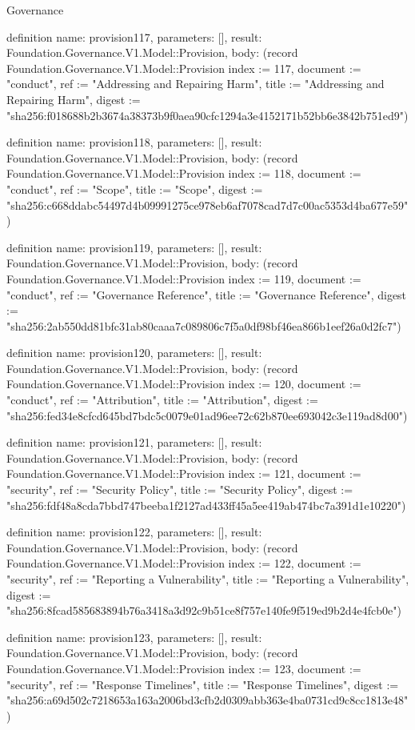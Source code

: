 \begin{lexlean}{Governance}
\begin{semanticmodule}
definition{
  name: provision117,
  parameters: [],
  result: Foundation.Governance.V1.Model::Provision,
  body: (record Foundation.Governance.V1.Model::Provision {index := 117, document := "conduct", ref := "Addressing and Repairing Harm", title := "Addressing and Repairing Harm", digest := "sha256:f018688b2b3674a38373b9f0aea90cfc1294a3e4152171b52bb6e3842b751ed9"})
}

definition{
  name: provision118,
  parameters: [],
  result: Foundation.Governance.V1.Model::Provision,
  body: (record Foundation.Governance.V1.Model::Provision {index := 118, document := "conduct", ref := "Scope", title := "Scope", digest := "sha256:c668ddabc54497d4b09991275ce978eb6af7078cad7d7c00ac5353d4ba677e59"})
}

definition{
  name: provision119,
  parameters: [],
  result: Foundation.Governance.V1.Model::Provision,
  body: (record Foundation.Governance.V1.Model::Provision {index := 119, document := "conduct", ref := "Governance Reference", title := "Governance Reference", digest := "sha256:2ab550dd81bfc31ab80caaa7c089806c7f5a0df98bf46ea866b1eef26a0d2fc7"})
}

definition{
  name: provision120,
  parameters: [],
  result: Foundation.Governance.V1.Model::Provision,
  body: (record Foundation.Governance.V1.Model::Provision {index := 120, document := "conduct", ref := "Attribution", title := "Attribution", digest := "sha256:fed34e8cfcd645bd7bdc5c0079e01ad96ee72c62b870ee693042c3e119ad8d00"})
}

definition{
  name: provision121,
  parameters: [],
  result: Foundation.Governance.V1.Model::Provision,
  body: (record Foundation.Governance.V1.Model::Provision {index := 121, document := "security", ref := "Security Policy", title := "Security Policy", digest := "sha256:fdf48a8cda7bbd747beeba1f2127ad433ff45a5ee419ab474bc7a391d1e10220"})
}

definition{
  name: provision122,
  parameters: [],
  result: Foundation.Governance.V1.Model::Provision,
  body: (record Foundation.Governance.V1.Model::Provision {index := 122, document := "security", ref := "Reporting a Vulnerability", title := "Reporting a Vulnerability", digest := "sha256:8fcad585683894b76a3418a3d92c9b51ce8f757e140fe9f519ed9b2d4e4fcb0e"})
}

definition{
  name: provision123,
  parameters: [],
  result: Foundation.Governance.V1.Model::Provision,
  body: (record Foundation.Governance.V1.Model::Provision {index := 123, document := "security", ref := "Response Timelines", title := "Response Timelines", digest := "sha256:a69d502c7218653a163a2006bd3cfb2d0309abb363e4ba0731cd9c8cc1813e48"})
}


\end{semanticmodule}
\end{lexlean}
